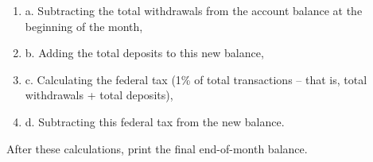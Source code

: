 \documentclass[]{book}
\begin{document}
\begin{enumerate}
\begin{enumerate}
        \item a. Subtracting the total withdrawals from the account balance at the beginning of the month, 
        \item b. Adding the total deposits to this new balance,
        \item c. Calculating the federal tax (1\% of total transactions – that is, total withdrawals + total deposits),
        \item d. Subtracting this federal tax from the new balance.

    \end{enumerate}

After these calculations, print the final end-of-month balance.

\end{enumerate}
\end{document}
